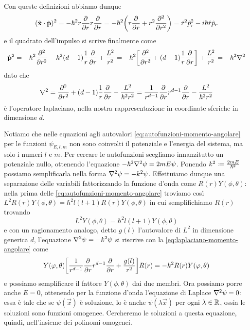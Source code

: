 Con queste definizioni abbiamo dunque
\begin{equation}
	({\hat{\mathbf{x}}}\cdot{\hat{\mathbf{p}}})^2=-\hbar^2r\frac{\partial {}}{\partial {r}}r\frac{\partial {}}{\partial {r}}=-\hbar^2\bigg(r\frac{\partial {}}{\partial {r}}+r^2\frac{\partial^2 {}}{\partial {r}^2}\bigg)=\hat{r}^2\hat{p}_r^2-i\hbar \hat{r}\hat{p}_r
\end{equation}
e il quadrato dell'impulso si scrive finalmente come
\begin{equation}
	\hat{\mathbf{p}}^2=-\hbar^2\frac{\partial^2 {}}{\partial {r}^2}-\hbar^2(d-1)\frac1{r}\frac{\partial {}}{\partial {r}}+\frac{L^2}{r^2}=
	-\hbar^2\bigg[\frac{\partial^2 {}}{\partial {r}^2}+(d-1)\frac1{r}\frac{\partial {}}{\partial {r}}\bigg]+\frac{L^2}{r^2}=
	-\hbar^2\nabla^2
\end{equation}
dato che
\begin{equation}
	\nabla^2=\frac{\partial^2 {}}{\partial {r}^2}+(d-1)\frac1{r}\frac{\partial {}}{\partial {r}}-\frac{L^2}{\hbar^2r^2}=
	\frac1{r^{d-1}}\frac{\partial {}}{\partial {r}}r^{d-1}\frac{\partial {}}{\partial {r}}-\frac{L^2}{\hbar^2r^2}
	\label{eq:laplaciano-momento-angolare}
\end{equation}
è l'operatore laplaciano, nella nostra rappresentazione in coordinate sferiche in dimensione $d$.

Notiamo che nelle equazioni agli autovalori \eqref{eq:autofunzioni-momento-angolare} per le funzioni $\psi_{E,l,m}$ non sono coinvolti il potenziale e l'energia del sistema, ma solo i numeri $l$ e $m$.
Per cercare le autofunzioni scegliamo innanzitutto un potenziale nullo, ottenendo l'equazione $-\hbar^2\nabla^2\psi=2mE\psi$.
Ponendo $k^2\defeq\frac{2mE}{\hbar^2}$ possiamo semplificarla nella forma $\nabla^2\psi=-k^2\psi$.
Effettuiamo dunque una separazione delle variabili fattorizzando la funzione d'onda come $R(r)Y(\phi,\theta)$: nella prima delle \eqref{eq:autofunzioni-momento-angolare} troviamo cos\`i $L^2R(r)Y(\phi,\theta)=\hbar^2l(l+1)R(r)Y(\phi,\theta)$ in cui semplifichiamo $R(r)$ trovando
\begin{equation}
	L^2Y(\phi,\theta)=\hbar^2l(l+1)Y(\phi,\theta)
\end{equation}
e con un ragionamento analogo, detto $g(l)$ l'autovalore di $L^2$ in dimensione generica $d$, l'equazione $\nabla^2\psi=-k^2\psi$ si riscrive con la \eqref{eq:laplaciano-momento-angolare} come
\begin{equation}
	Y(\varphi,\theta)\bigg[\frac1{r^{d-1}}\frac{\partial {}}{\partial {r}}r^{d-1}\frac{\partial {}}{\partial {r}}+\frac{g(l)}{r^2}\bigg]R(r)=-k^2R(r)Y(\varphi,\theta)
\end{equation}
e possiamo semplificare il fattore $Y(\phi,\theta)$ dai due membri.
Ora possiamo porre anche $E=0$, ottenendo per la funzione d'onda l'equazione di Laplace $\nabla^2\psi=0$: essa è tale che se $\psi(\vec x)$ è soluzione, lo è anche $\psi(\lambda\vec x)$ per ogni $\lambda\in\mathbb{R}$, ossia le soluzioni sono funzioni omogenee.
Cercheremo le soluzioni a questa equazione, quindi, nell'insieme dei polinomi omogenei.
